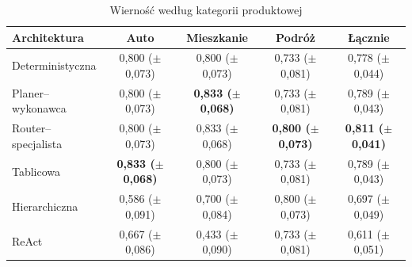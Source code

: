   \begin{table}[H]
    \caption{Wierność według kategorii produktowej}\label{tab:wiernosc-kategoria}
    \centering
    \small
    \renewcommand{\arraystretch}{1.3}
    \begin{tabular}{@{} l c c c c @{}}
      \toprule
      \textbf{Architektura}
      & \textbf{Auto}
      & \textbf{Mieszkanie}
      & \textbf{Podróż}
      & \textbf{Łącznie}                                                                                                                              \\
      \midrule
      Deterministyczna    & 0{,}800 (\(\pm\) 0{,}073)          & 0{,}800 (\(\pm\) 0{,}073)          & 0{,}733 (\(\pm\) 0{,}081)          & 0{,}778 (\(\pm\) 0{,}044)          \\
      Planer--wykonawca   & 0{,}800 (\(\pm\) 0{,}073)          & \textbf{0{,}833 (\(\pm\) 0{,}068)} & 0{,}733 (\(\pm\) 0{,}081)          & 0{,}789 (\(\pm\) 0{,}043)          \\
      Router--specjalista & 0{,}800 (\(\pm\) 0{,}073)          & 0{,}833 (\(\pm\) 0{,}068)          & \textbf{0{,}800 (\(\pm\) 0{,}073)} & \textbf{0{,}811 (\(\pm\) 0{,}041)} \\
      Tablicowa           & \textbf{0{,}833 (\(\pm\) 0{,}068)} & 0{,}800 (\(\pm\) 0{,}073)          & 0{,}733 (\(\pm\) 0{,}081)          & 0{,}789 (\(\pm\) 0{,}043)          \\
      Hierarchiczna       & 0{,}586 (\(\pm\) 0{,}091)          & 0{,}700 (\(\pm\) 0{,}084)          & 0{,}800 (\(\pm\) 0{,}073)          & 0{,}697 (\(\pm\) 0{,}049)          \\
      ReAct               & 0{,}667 (\(\pm\) 0{,}086)          & 0{,}433 (\(\pm\) 0{,}090)          & 0{,}733 (\(\pm\) 0{,}081)          & 0{,}611 (\(\pm\) 0{,}051)          \\
      \bottomrule
    \end{tabular}
  \end{table}

